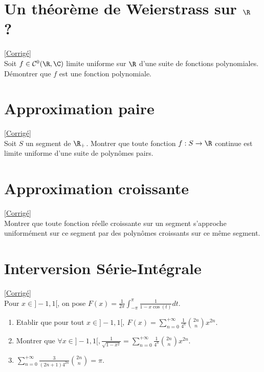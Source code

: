 \documentclass{book}
\begin{document}
	\section{Un théorème de Weierstrass sur $\R$ ? }
	\textcolor{blue}{\hyperref[Un théorème de Weierstrass sur R ? Corrigé]{[Corrigé]}}\\
	\label{Un théorème de Weierstrass sur R ?}
	Soit $f\in \mathcal C^0(\R,\C)$ limite uniforme sur $\R$ d'une suite de fonctions polynomiales. Démontrer que $f$ est une fonction polynomiale.
	
	\section{Approximation paire}
	\textcolor{blue}{\hyperref[sec:approximation-paire]{[Corrigé]}}\\
	\label{Approximation paire}
	Soit $S$ un segment de $\R_+$. Montrer que toute fonction $f:S\to \R$ continue est limite uniforme d'une suite de polynômes pairs.
	
	\section{Approximation croissante}
	\textcolor{blue}{\hyperref[sec:approximation-croissante]{[Corrigé]}}\\
	\label{Approximation croissante}
	Montrer que toute fonction réelle croissante sur un segment s'approche uniformément sur ce segment par des polynômes croissants sur ce même segment.
	
	\section{Interversion Série-Intégrale}
	\textcolor{blue}{\hyperref[sec:interversion-serie-integrale]{[Corrigé]}}\\
	\label{Interversion Série-Intégrale}
	Pour $x\in]-1,1[$, on pose $F(x)=\displaystyle\frac{1}{2\pi}\int_{-\pi}^{\pi}\frac{1}{1-x\cos(t)}dt$.
	\begin{enumerate}[leftmargin=*]
		\item Etablir que pour tout $x\in]-1,1[, \ F(x)=\displaystyle\sum_{n=0}^{+\infty}\frac{1}{4^n}\binom{2n}{n}x^{2n}$.
		\item Montrer que $\forall x\in]-1,1[, \displaystyle\frac{1}{\sqrt{1-x^2}}=\sum_{n=0}^{+\infty}\frac{1}{4^n}\binom{2n}{n}x^{2n}$.
		\item $\displaystyle\sum_{n=0}^{+\infty}\frac{3}{(2n+1)4^{2n}}\binom{2n}{n}=\pi$.
	\end{enumerate}
	
\end{document}

